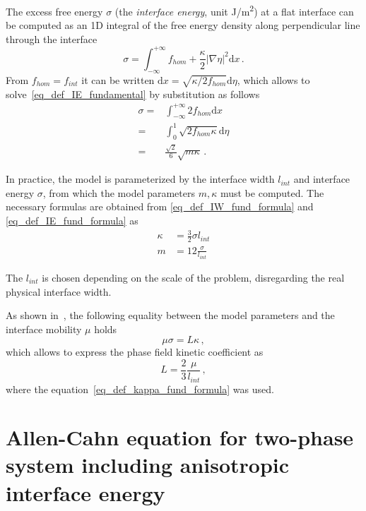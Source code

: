 The excess free energy $\sigma$ (the \textit{interface energy}, unit \unit{\J/\m^2}) at a flat interface can be computed as an 1D integral of the free energy density  along perpendicular line through the interface
\begin{equation} \label{eq_def_IE_fundamental}
	\sigma = \int_{-\infty}^{+\infty} f_{hom} + \frac{\kappa}{2}|\nabla\eta|^2 \mathrm{d}x \,.
\end{equation}
From $f_{hom}=f_{int}$ it can be written $\mathrm{d}x = \sqrt{\kappa/2 f_{hom}}\mathrm{d}\eta$, which allows to solve~\eqref{eq_def_IE_fundamental} by substitution as follows
\begin{align} 
	\sigma =& \int_{-\infty}^{+\infty} 2f_{hom} \mathrm{d}x \\
			=& \int_{0}^{1} \sqrt{2 f_{hom}\kappa} \mathrm{d}\eta \\ 
\label{eq_def_IE_fund_formula}			
			=& \frac{\sqrt{2}}{6}\sqrt{m\kappa}  \,. 
\end{align}

In practice, the model is parameterized by the interface width $l_{int}$ and interface energy $\sigma$, from which the model parameters $m,\kappa $ must be computed. The necessary formulas are obtained from \eqref{eq_def_IW_fund_formula} and \eqref{eq_def_IE_fund_formula} as
\begin{align}
\label{eq_def_kappa_fund_formula} 	\kappa 	&= \frac{3}{2}\sigma l_{int} \\
			m 		&= 12\frac{\sigma}{l_{int}}
\end{align}

The $l_{int}$ is chosen depending on the scale of the problem, disregarding the real physical interface width. 

As shown in~\cite{Moelans2008}, the following equality between the model parameters and the interface mobility $\mu$ holds
\begin{equation}
	\mu\sigma = L\kappa \,,
\end{equation}
which allows to express the phase field kinetic coefficient as
\begin{equation}\label{eq_def_L_fund_formula}
	L = \frac{2}{3}\frac{\mu}{l_{int}}\,,
\end{equation}
where the equation~\eqref{eq_def_kappa_fund_formula} was used.


\section{Allen-Cahn equation for two-phase system including anisotropic interface energy}
